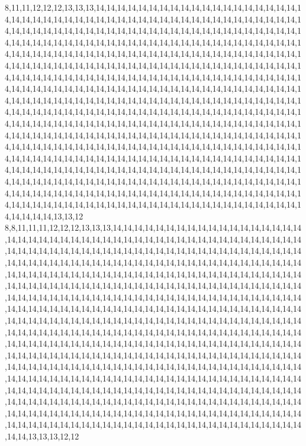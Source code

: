 8,11,11,12,12,12,13,13,13,14,14,14,14,14,14,14,14,14,14,14,14,14,14,14,14,14,14,14,14,14,14,14,14,14,14,14,14,14,14,14,14,14,14,14,14,14,14,14,14,14,14,14,14,14,14,14,14,14,14,14,14,14,14,14,14,14,14,14,14,14,14,14,14,14,14,14,14,14,14,14,14,14,14,14,14,14,14,14,14,14,14,14,14,14,14,14,14,14,14,14,14,14,14,14,14,14,14,14,14,14,14,14,14,14,14,14,14,14,14,14,14,14,14,14,14,14,14,14,14,14,14,14,14,14,14,14,14,14,14,14,14,14,14,14,14,14,14,14,14,14,14,14,14,14,14,14,14,14,14,14,14,14,14,14,14,14,14,14,14,14,14,14,14,14,14,14,14,14,14,14,14,14,14,14,14,14,14,14,14,14,14,14,14,14,14,14,14,14,14,14,14,14,14,14,14,14,14,14,14,14,14,14,14,14,14,14,14,14,14,14,14,14,14,14,14,14,14,14,14,14,14,14,14,14,14,14,14,14,14,14,14,14,14,14,14,14,14,14,14,14,14,14,14,14,14,14,14,14,14,14,14,14,14,14,14,14,14,14,14,14,14,14,14,14,14,14,14,14,14,14,14,14,14,14,14,14,14,14,14,14,14,14,14,14,14,14,14,14,14,14,14,14,14,14,14,14,14,14,14,14,14,14,14,14,14,14,14,14,14,14,14,14,14,14,14,14,14,14,14,14,14,14,14,14,14,14,14,14,14,14,14,14,14,14,14,14,14,14,14,14,14,14,14,14,14,14,14,14,14,14,14,14,14,14,14,14,14,14,14,14,14,14,14,14,14,14,14,14,14,14,14,14,14,14,14,14,14,14,14,14,14,14,14,14,14,14,14,14,14,14,14,14,14,14,14,14,14,14,14,14,14,14,14,14,14,14,14,14,14,14,14,14,14,14,14,14,14,14,14,14,14,14,14,14,14,14,14,14,14,14,14,14,14,14,14,14,14,14,14,14,14,14,14,14,14,14,14,14,14,14,14,14,14,14,14,14,14,14,14,14,14,14,14,14,14,14,14,14,14,14,14,14,14,14,14,14,14,14,14,14,14,14,14,14,14,14,14,14,14,14,14,14,14,14,14,14,14,14,14,13,13,12
8,8,11,11,11,12,12,12,13,13,13,14,14,14,14,14,14,14,14,14,14,14,14,14,14,14,14,14,14,14,14,14,14,14,14,14,14,14,14,14,14,14,14,14,14,14,14,14,14,14,14,14,14,14,14,14,14,14,14,14,14,14,14,14,14,14,14,14,14,14,14,14,14,14,14,14,14,14,14,14,14,14,14,14,14,14,14,14,14,14,14,14,14,14,14,14,14,14,14,14,14,14,14,14,14,14,14,14,14,14,14,14,14,14,14,14,14,14,14,14,14,14,14,14,14,14,14,14,14,14,14,14,14,14,14,14,14,14,14,14,14,14,14,14,14,14,14,14,14,14,14,14,14,14,14,14,14,14,14,14,14,14,14,14,14,14,14,14,14,14,14,14,14,14,14,14,14,14,14,14,14,14,14,14,14,14,14,14,14,14,14,14,14,14,14,14,14,14,14,14,14,14,14,14,14,14,14,14,14,14,14,14,14,14,14,14,14,14,14,14,14,14,14,14,14,14,14,14,14,14,14,14,14,14,14,14,14,14,14,14,14,14,14,14,14,14,14,14,14,14,14,14,14,14,14,14,14,14,14,14,14,14,14,14,14,14,14,14,14,14,14,14,14,14,14,14,14,14,14,14,14,14,14,14,14,14,14,14,14,14,14,14,14,14,14,14,14,14,14,14,14,14,14,14,14,14,14,14,14,14,14,14,14,14,14,14,14,14,14,14,14,14,14,14,14,14,14,14,14,14,14,14,14,14,14,14,14,14,14,14,14,14,14,14,14,14,14,14,14,14,14,14,14,14,14,14,14,14,14,14,14,14,14,14,14,14,14,14,14,14,14,14,14,14,14,14,14,14,14,14,14,14,14,14,14,14,14,14,14,14,14,14,14,14,14,14,14,14,14,14,14,14,14,14,14,14,14,14,14,14,14,14,14,14,14,14,14,14,14,14,14,14,14,14,14,14,14,14,14,14,14,14,14,14,14,14,14,14,14,14,14,14,14,14,14,14,14,14,14,14,14,14,14,14,14,14,14,14,14,14,14,14,14,14,14,14,14,14,14,14,14,14,14,14,14,14,14,14,14,14,14,14,14,14,14,14,14,14,14,14,14,14,14,14,14,14,14,14,14,14,14,14,14,14,14,14,14,13,13,13,12,12
